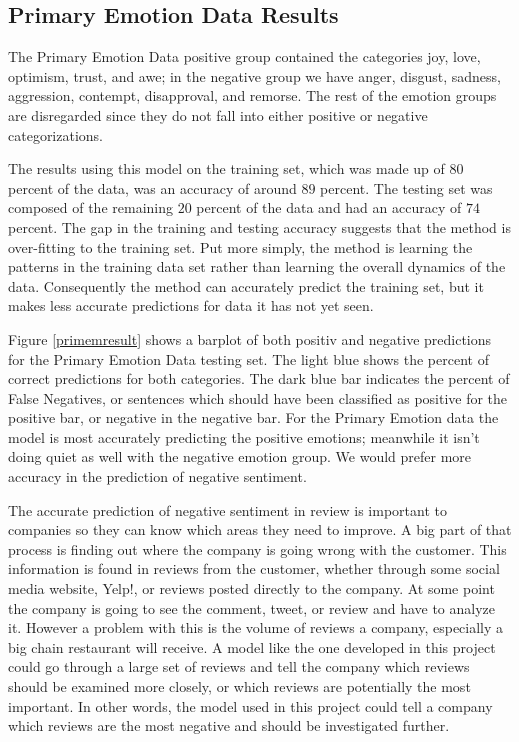 \documentclass[titlepage,letterpaper]{article}
\begin{document}
\subsection{Primary Emotion Data Results}
The Primary Emotion Data positive group contained the categories joy, love, optimism, trust, and awe; in the negative group we have anger, disgust, sadness, aggression, contempt, disapproval, and remorse. The rest of the emotion groups are disregarded since they do not fall into either positive or negative categorizations.

The results using this model on the training set, which was made up of $80$ percent of the data, was an accuracy of around $89$ percent. The testing set was composed of the remaining $20$ percent of the data and had an accuracy of $74$ percent. The gap in the training and testing accuracy suggests that the method is over-fitting to  the training set. Put more simply, the method is learning the patterns in the training data set rather than learning the overall dynamics of the data. Consequently the method can accurately predict the training set, but it makes less accurate predictions for data it has not yet seen.

Figure \ref{primemresult} shows a barplot of both positiv and negative predictions for the Primary Emotion Data testing set. The light blue shows the percent of correct predictions for both categories. The dark blue bar indicates the percent of False Negatives, or sentences which should have been classified as positive for the positive bar, or negative in the negative bar. For the Primary Emotion data the model is most accurately predicting the positive emotions; meanwhile it isn't doing quiet as well with the negative emotion group. We would prefer more accuracy in the prediction of negative sentiment. 

The accurate prediction of negative sentiment in review is important to companies so they can know which areas they need to improve. A big part of that process is finding out where the company is going wrong with the customer. This information is found in reviews from the customer, whether through some social media website, Yelp!, or reviews posted directly to the company. At some point the company is going to see the comment, tweet, or review and have to analyze it. However a problem with this is the volume of reviews a company, especially a big chain restaurant will receive. A model like the one developed in this project could go through a large set of reviews and tell the company which reviews should be examined more closely, or which reviews are potentially the most important. In other words, the model used in this project could tell a company which reviews are the most negative and should be investigated further.   
\end{document}
